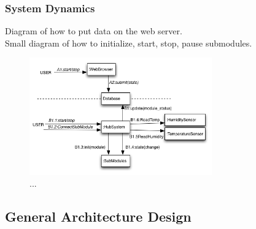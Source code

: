 	\subsubsection{System Dynamics}
			Diagram of how to put data on the web server.
			\\Small diagram of how to initialize, start, stop, pause submodules.
			\begin{figure}[h!]		%
			\begin{centering}
				 \includegraphics[width=0.7\textwidth]{images/communication_diagram.png}
				\caption{...}
		 	\end{centering}
		\end{figure}		
\subsection{General Architecture Design}
